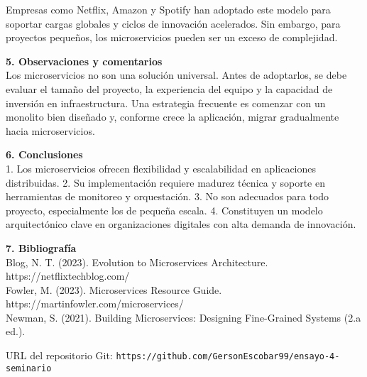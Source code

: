 \documentclass[12pt]{article}
\begin{document}
Empresas como Netflix, Amazon y Spotify han adoptado este modelo para soportar cargas globales y ciclos de innovación acelerados. Sin embargo, para proyectos pequeños, los microservicios pueden ser un exceso de complejidad.

\textbf{5. Observaciones y comentarios}  
\\
Los microservicios no son una solución universal. Antes de adoptarlos, se debe evaluar el tamaño del proyecto, la experiencia del equipo y la capacidad de inversión en infraestructura. Una estrategia frecuente es comenzar con un monolito bien diseñado y, conforme crece la aplicación, migrar gradualmente hacia microservicios.

\textbf{6. Conclusiones}  
\\
1. Los microservicios ofrecen flexibilidad y escalabilidad en aplicaciones distribuidas.  
2. Su implementación requiere madurez técnica y soporte en herramientas de monitoreo y orquestación.  
3. No son adecuados para todo proyecto, especialmente los de pequeña escala.  
4. Constituyen un modelo arquitectónico clave en organizaciones digitales con alta demanda de innovación.  

\textbf{7. Bibliografía}  
\\
Blog, N. T. (2023). Evolution to Microservices Architecture. https://netflixtechblog.com/
\\
Fowler, M. (2023). Microservices Resource Guide. https://martinfowler.com/microservices/
\\
Newman, S. (2021). Building Microservices: Designing Fine-Grained Systems (2.a ed.).


\vspace{0.5cm}
\noindent URL del repositorio Git: \texttt{https://github.com/GersonEscobar99/ensayo-4-seminario}
\end{document}
